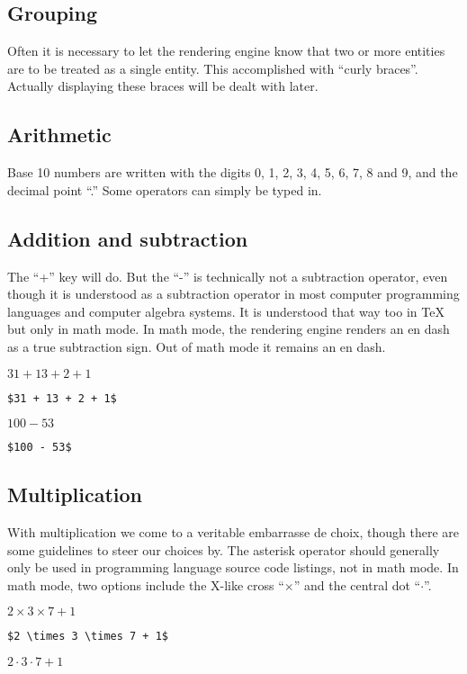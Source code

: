 \subsection{Grouping}

Often it is necessary to let the rendering engine know that two or more entities are to be treated as a single entity. This accomplished with ``curly braces''. Actually displaying these braces will be dealt with later.


\subsection*{Arithmetic}

Base 10 numbers are written with the digits 0, 1, 2, 3, 4, 5, 6, 7, 8 and 9, and the decimal point ``.'' Some operators can simply be typed in.

\subsection{Addition and subtraction}

The ``+'' key will do. But the ``-'' is technically not a subtraction operator, even though it is understood as a subtraction operator in most computer programming languages and computer algebra systems. It is understood that way too in \TeX{} but only in math mode. In math mode, the rendering engine renders an en dash as a true subtraction sign. Out of math mode it remains an en dash.

$31 + 13 + 2 + 1$

\verb=$31 + 13 + 2 + 1$=

$100 - 53$

\verb=$100 - 53$=

\subsection{Multiplication}

With multiplication we come to a veritable embarrasse de choix, though there are some guidelines to steer our choices by. The asterisk operator should generally only be used in programming language source code listings, not in math mode. In math mode, two options include the X-like cross ``$\times$'' and the central dot ``$\cdot$''.

$2 \times 3 \times 7 + 1$

\verb=$2 \times 3 \times 7 + 1$=

$2 \cdot 3 \cdot 7 + 1$

